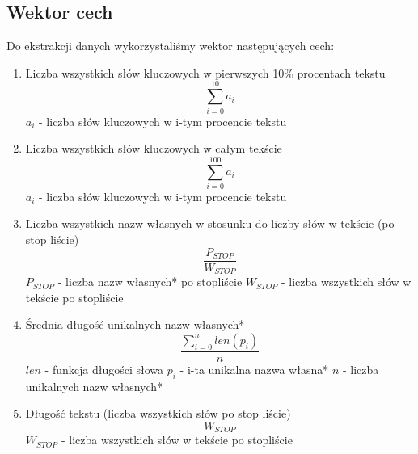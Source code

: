 \documentclass{classrep}
\begin{document}
\subsection{Wektor cech}
Do ekstrakcji danych wykorzystaliśmy wektor następujących cech:
\begin{enumerate}
  \item Liczba wszystkich słów kluczowych w pierwszych 10\% procentach tekstu
  \newline 
  \begin{equation}
  	\sum_{i=0}^{10}a_i
  \end{equation}
   \newline \quad $a_i$ - liczba słów kluczowych w i-tym procencie tekstu
   
  \item Liczba wszystkich słów kluczowych w całym tekście
 \newline 
  \begin{equation}
  	\sum_{i=0}^{100}a_i
  \end{equation}
  \newline\quad $a_i$ - liczba słów kluczowych w i-tym procencie tekstu
  
  \item Liczba wszystkich nazw własnych w stosunku do liczby słów w tekście (po stop liście)
  \newline 
  \begin{equation}
  	\frac{P_{STOP}}{W_{STOP}}
  \end{equation}
  \newline \quad $P_{STOP}$ - liczba nazw własnych* po stopliście
  \newline \quad $W_{STOP}$ - liczba wszystkich słów w tekście po stopliście
  
  \item Średnia długość unikalnych nazw własnych*
  \newline
  \begin{equation}
  	\frac{\sum_{i=0}^nlen(p_i)}{n}
  \end{equation}
  \newline \quad $len$ - funkcja długości słowa
  \newline \quad $p_i$ - i-ta unikalna nazwa własna*
  \newline \quad $n$ - liczba unikalnych nazw własnych*
  
  \item Długość tekstu (liczba wszystkich słów po stop liście)
  \begin{equation}
  	W_{STOP}
  \end{equation}
  \newline \quad $W_{STOP}$ - liczba wszystkich słów w tekście po stopliście
  

\end{enumerate}
\end{document}
